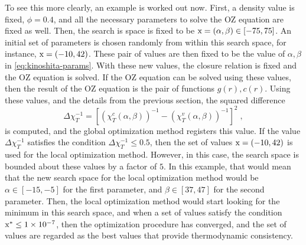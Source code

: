 To see this more clearly, an example is worked out now. First, a density value is fixed, 
\(\phi = 0.4\), and all the necessary parameters to solve the OZ equation are fixed as 
well. Then, the search is space is fixed to be \(\rm{x} = \left(\alpha, \beta\right) \in \left[-75, 75\right]\). 
An initial set of parameters is chosen randomly from within this search space, for 
instance, \(\rm{x} = \left(-10, 42\right)\). These pair of values are then fixed to be the 
value of \(\alpha, \beta\) in \autoref{eq:kinoshita-params}. With these new values, the 
closure relation is fixed and the OZ equation is solved. If the OZ equation can be solved 
using these values, then the result of the OZ equation is the pair of functions 
\(g(r), c(r)\). Using these values, and the details from the previous section, the squared 
difference 
\[
    \Delta \chi^{-1}_{T} = {\left[ {\left(\chi_{T}^{c} \left(\alpha, \beta\right) \right)}^{-1} - {\left(\chi_{T}^{v} \left(\alpha, \beta\right) \right)}^{-1} \right]}^2 
\; ,
\] 
is computed, and the global optimization method registers this value. If the value 
\(\Delta \chi^{-1}_{T}\) satisfies the condition \(\Delta \chi^{-1}_{T} \leq 0.5\), then 
the set of values \(\rm{x} = \left(-10, 42\right)\) is used for the local optimization 
method. However, in this case, the search space is bounded about these values by a factor 
of \(5\). In this example, that would mean that the new search space for the local 
optimization method would be \(\alpha \in [-15, -5]\) for the first parameter, and 
\(\beta \in [37, 47]\) for the second parameter. Then, the local optimization method would 
start looking for the minimum in this search space, and when a set of values satisfy the 
condition \(\rm{x}^{*} \leq \num{1e-7}\), then the optimization procedure has converged, 
and the set of values are regarded as the best values that provide thermodynamic 
consistency.


